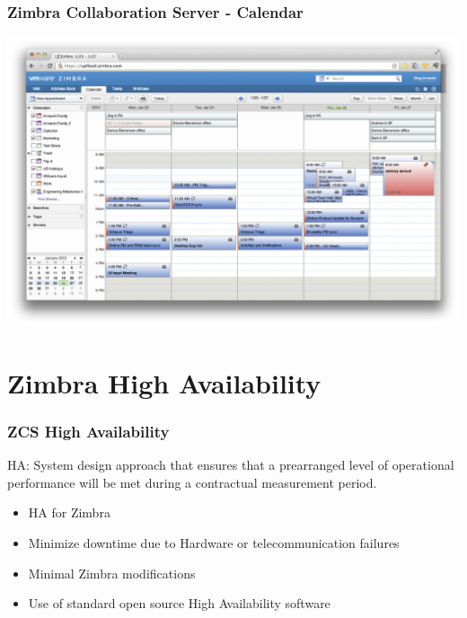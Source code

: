 \documentclass[10pt]{beamer}
\begin{document}
\begin{frame}
\frametitle{Zimbra Collaboration Server - Calendar}

\begin{center}
  \includegraphics[scale=0.4,keepaspectratio=true]{./img/zimbra-calendar.jpg}
\end{center}


\end{frame}
\section {Zimbra High Availability}
\begin{frame}
\frametitle{ZCS High Availability}


\begin{block}{}
HA: System design approach that ensures that a prearranged level of operational performance will be met during a contractual measurement period.
\end{block}


\quad

\begin{itemize}

\item HA for Zimbra
\item Minimize downtime due to Hardware or telecommunication failures
\item Minimal Zimbra modifications
\item Use of standard open source High Availability software

\end{itemize}

\end{frame}
\end{document}
